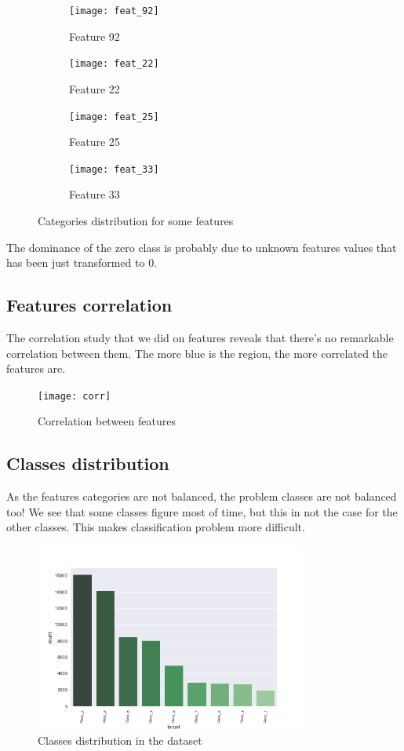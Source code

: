 \documentclass[a4paper,english,12pt]{article}
\begin{document}
\begin{figure}[H]
\begin{subfigure}{0.22\textwidth}
		\texttt{[image: feat\_92]}
		\caption{Feature 92}
	\end{subfigure}	
	\begin{subfigure}{0.22\textwidth}
		\texttt{[image: feat\_22]}
		\caption{Feature 22}
	\end{subfigure}	
	\begin{subfigure}{0.22\textwidth}
		\texttt{[image: feat\_25]}
		\caption{Feature 25}
	\end{subfigure}	
	\begin{subfigure}{0.22\textwidth}
		\texttt{[image: feat\_33]}
		\caption{Feature 33}
	\end{subfigure}	
	\caption{Categories distribution for some features}
	\end{figure}


The dominance of the zero class is probably due to unknown features values that has been just transformed to 0.

\subsection{Features correlation}
The correlation study that we did on features reveals that there's no remarkable correlation between them. The more blue is the region, the more correlated the features are. 

\begin{figure}[H]
	\centering
	\texttt{[image: corr]}
	\caption{Correlation between features}
\end{figure}

\subsection{Classes distribution}

As the features categories are not balanced, the problem classes are not balanced too! We see that some classes figure most of time, but this in not the case for the other classes. This makes classification problem more difficult.

\begin{figure}[H]
	\centering
	\includegraphics[width=0.8\textwidth,keepaspectratio]{target}
	\caption{Classes distribution in the dataset}
\end{figure}
\end{document}
